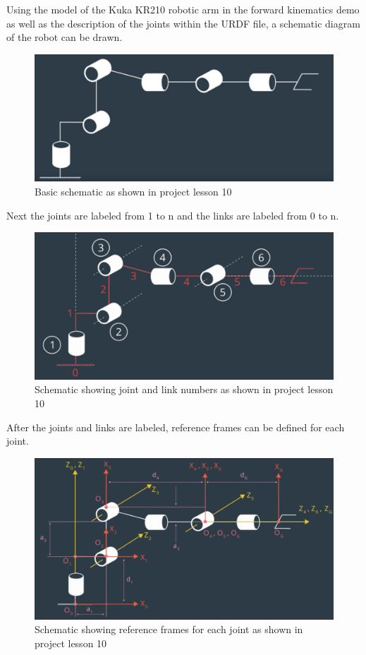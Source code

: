 \documentclass{article}
\begin{document}
Using the model of the Kuka KR210 robotic arm in the forward kinematics demo as well as the description of the joints within the URDF file, a schematic diagram of the robot can be drawn.

\begin{figure}[H]
    \includegraphics[width=\linewidth]{KR210scheme.png}
    \caption{Basic schematic as shown in project lesson 10}
    \label{fig:scheme}
\end{figure}

Next the joints are labeled from 1 to n and the links are labeled from 0 to n.

\begin{figure}[H]
    \includegraphics[width=\linewidth]{KR210JL.png}
    \caption{Schematic showing joint and link numbers as shown in project lesson 10}
    \label{fig:JLscheme}
\end{figure}

After the joints and links are labeled, reference frames can be defined for each joint.

\begin{figure}[H]
    \includegraphics[width=\linewidth]{KR210RF.png}
    \caption{Schematic showing reference frames for each joint as shown in project lesson 10}
    \label{fig:RFscheme}
\end{figure}
\end{document}
